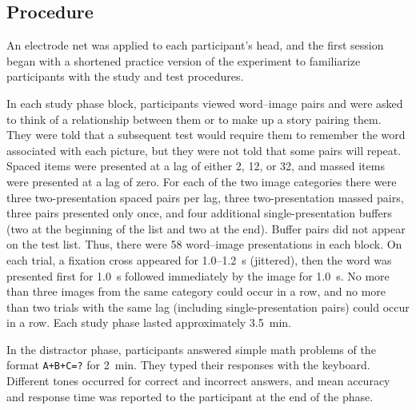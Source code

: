 \subsection{Procedure}

An electrode net was applied to each participant's head, and the first session began with a shortened practice version of the experiment to familiarize participants with the study and test procedures.




In each study phase block, participants viewed word--image pairs and were asked to think of a relationship between them or to make up a story pairing them.  They were told that a subsequent test would require them to remember the word associated with each picture, but they were not told that some pairs will repeat.  Spaced items were presented at a lag of either 2, 12, or 32, and massed items were presented at a lag of zero.  For each of the two image categories there were three two-presentation spaced pairs per lag, three two-presentation massed pairs, three pairs presented only once, and four additional single-presentation buffers (two at the beginning of the list and two at the end).  Buffer pairs did not appear on the test list.
Thus, there were 58 word--image presentations in each block.  On each trial, a fixation cross appeared for 1.0--1.2~s (jittered), then the word was presented first for 1.0~s followed immediately by the image for 1.0~s.  No more than three images from the same category could occur in a row, and no more than two trials with the same lag (including single-presentation pairs) could occur in a row.  Each study phase lasted approximately 3.5~min.

In the distractor phase, participants answered simple math problems of the format \texttt{A+B+C=?} for 2~min.  They typed their responses with the keyboard.  Different tones occurred for correct and incorrect answers, and mean accuracy and response time was reported to the participant at the end of the phase.

